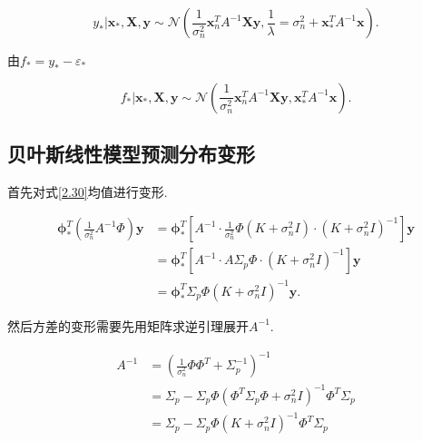             \begin{equation}\label{A4.30}
                y_{*}|\boldsymbol{x}_{*},\boldsymbol{X},\boldsymbol{y}\sim\mathcal{N}(\frac{1}{\sigma^{2}_{n}}\boldsymbol{x}^{T}_{n}A^{-1}\boldsymbol{Xy}, \frac{1}{\lambda}=\sigma^{2}_{n}+\boldsymbol{x}^{T}_{*}A^{-1}\boldsymbol{x}).
            \end{equation}

            由$f_{*}=y_{*}-\varepsilon_{*}$

            \begin{equation}\label{A4.31}
                f_{*}|\boldsymbol{x}_{*},\boldsymbol{X},\boldsymbol{y}\sim\mathcal{N}(\frac{1}{\sigma^{2}_{n}}\boldsymbol{x}^{T}_{n}A^{-1}\boldsymbol{Xy}, \boldsymbol{x}^{T}_{*}A^{-1}\boldsymbol{x}).
            \end{equation}
            
    \subsection{贝叶斯线性模型预测分布变形} \label{A.5}
        首先对式\ref{2.30}均值进行变形.

        \begin{equation} \label{A5.32}
            \begin{aligned}
                \boldsymbol{\phi}^{T}_{*}\left( \frac{1}{\sigma^{2}_{n}}A^{-1}\boldsymbol{\varPhi} \right)\boldsymbol{y}
                &=\boldsymbol{\phi}^{T}_{*}\left[ A^{-1}\cdot \frac{1}{\sigma^{2}_{n}}\boldsymbol{\varPhi}(K+\sigma^{2}_{n}I)\cdot (K+\sigma^{2}_{n}I)^{-1} \right] \boldsymbol{y} \\
                &=\boldsymbol{\phi}^{T}_{*}\left[ A^{-1}\cdot A\Sigma_{p}\boldsymbol{\varPhi} \cdot (K+\sigma^{2}_{n}I)^{-1} \right] \boldsymbol{y} \\
                &=\boldsymbol{\phi}^{T}_{*}\Sigma_{p}\boldsymbol{\varPhi}(K+\sigma^{2}_{n}I)^{-1}\boldsymbol{y}.
            \end{aligned}
        \end{equation}

        然后方差的变形需要先用矩阵求逆引理展开$A^{-1}$.

        \begin{equation} \label{A5.33}
            \begin{aligned}
                A^{-1}&=\left(\frac{1}{\sigma^{2}_{n}}\boldsymbol{\varPhi}\boldsymbol{\varPhi}^{T}+\Sigma^{-1}_{p}\right)^{-1} \\
                &=\Sigma_{p}-\Sigma_{p}\boldsymbol{\varPhi}(\boldsymbol{\varPhi}^{T}\Sigma_{p}\boldsymbol{\varPhi} + \sigma^{2}_{n}I)^{-1}\boldsymbol{\varPhi}^{T}\Sigma_{p} \\
                &=\Sigma_{p}-\Sigma_{p}\boldsymbol{\varPhi}(K + \sigma^{2}_{n}I)^{-1}\boldsymbol{\varPhi}^{T}\Sigma_{p} \\
            \end{aligned}
        \end{equation}

